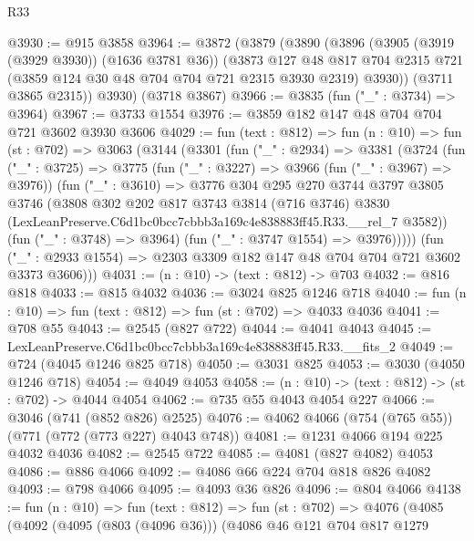 \begin{lexlean}{R33}
\begin{coremodule}
@3930 := @915 @3858
@3964 := @3872
    (@3879
      (@3890
        (@3896
          (@3905 (@3919 (@3929 @3930)) (@1636 @3781 @36))
          (@3873
            @127
            @48
            @817
            @704
            @2315
            @721
            (@3859 @124 @30 @48 @704 @704 @721 @2315 @3930 @2319)
            @3930))
        (@3711 @3865 @2315))
      @3930)
    (@3718 @3867)
@3966 := @3835 (fun ("_" : @3734) => @3964)
@3967 := @3733 @1554
@3976 := @3859 @182 @147 @48 @704 @704 @721 @3602 @3930 @3606
@4029 := fun (text : @812) =>
  fun (n : @10) =>
  fun (st : @702) =>
  @3063
    (@3144
      (@3301
        (fun ("_" : @2934) =>
        @3381
          (@3724
            (fun ("_" : @3725) =>
            @3775
              (fun ("_" : @3227) => @3966 (fun ("_" : @3967) => @3976))
              (fun ("_" : @3610) =>
              @3776
                @304
                @295
                @270
                @3744
                @3797
                @3805
                @3746
                (@3808
                  @302
                  @202
                  @817
                  @3743
                  @3814
                  (@716 @3746)
                  @3830
                  (LexLeanPreserve.C6d1bc0bcc7cbbb3a169c4e838883ff45.R33.__rel_7 @3582))
                (fun ("_" : @3748) => @3964)
                (fun ("_" : @3747 @1554) => @3976)))))
        (fun ("_" : @2933 @1554) => @2303 @3309 @182 @147 @48 @704 @704 @721 @3602 @3373 @3606)))
@4031 := (n : @10) -> (text : @812) -> @703
@4032 := @816 @818
@4033 := @815 @4032
@4036 := @3024 @825 @1246 @718
@4040 := fun (n : @10) => fun (text : @812) => fun (st : @702) => @4033 @4036
@4041 := @708 @55
@4043 := @2545 (@827 @722)
@4044 := @4041 @4043
@4045 := LexLeanPreserve.C6d1bc0bcc7cbbb3a169c4e838883ff45.R33.__fits_2
@4049 := @724 (@4045 @1246 @825 @718)
@4050 := @3031 @825
@4053 := @3030 (@4050 @1246 @718)
@4054 := @4049 @4053
@4058 := (n : @10) -> (text : @812) -> (st : @702) -> @4044 @4054
@4062 := @735 @55 @4043 @4054 @227
@4066 := @3046 (@741 (@852 @826) @2525)
@4076 := @4062 @4066 (@754 (@765 @55)) (@771 (@772 (@773 @227) @4043 @748))
@4081 := @1231 @4066 @194 @225 @4032 @4036
@4082 := @2545 @722
@4085 := @4081 (@827 @4082) @4053
@4086 := @886 @4066
@4092 := @4086 @66 @224 @704 @818 @826 @4082
@4093 := @798 @4066
@4095 := @4093 @36 @826
@4096 := @804 @4066
@4138 := fun (n : @10) =>
  fun (text : @812) =>
  fun (st : @702) =>
  @4076
    (@4085
      (@4092
        (@4095 (@803 (@4096 @36)))
        (@4086
          @46
          @121
          @704
          @817
          @1279

\end{coremodule}
\end{lexlean}
